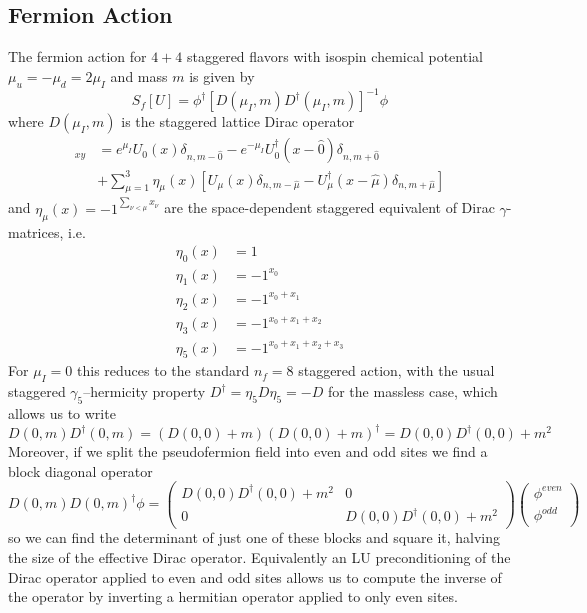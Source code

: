 \documentclass[a4paper,12pt]{article}
\begin{document}
\subsection{Fermion Action}
The fermion action for $4+4$ staggered flavors with isospin chemical potential $\mu_u = -\mu_d = 2 \mu_I$ and mass $m$ is given by
\begin{equation}
\label{eq:action_fermion}
 S_f[U] = \phi^{\dagger} [D(\mu_I,m) D^{\dagger}(\mu_I,m)]^{-1} \phi
\end{equation}
where $D(\mu_I,m)$ is the staggered lattice Dirac operator
\begin{align}
 [D(\mu_I,m)]_{xy} &= e^{\mu_I} U_{0}(x) \delta_{n,m-\hat0} - e^{-\mu_I} U_{0}^{\dagger}(x-\hat0) \delta_{n,m+\hat0} \\
 &+ \sum_{\mu=1}^{3} \eta_{\mu}(x) \left[ U_{\mu}(x) \delta_{n,m-\hat\mu} - U_{\mu}^{\dagger}(x-\hat\mu) \delta_{n,m+\hat\mu} \right]
\end{align}
and $\eta_{\mu}(x) = -1^{\sum_{\nu<\mu}x_{\nu}}$ are the space-dependent staggered equivalent of Dirac $\gamma$-matrices, i.e.
\begin{align}
 \eta_{0}(x) &= 1 \\
 \eta_{1}(x) &= -1^{x_0} \\
 \eta_{2}(x) &= -1^{x_0+x_1} \\
 \eta_{3}(x) &= -1^{x_0+x_1+x_2} \\
 \eta_{5}(x) &= -1^{x_0+x_1+x_2+x_3}
\end{align}
For $\mu_I=0$ this reduces to the standard $n_f=8$ staggered action, with the usual staggered $\gamma_5$--hermicity property $D^{\dagger} = \eta_5 D \eta_5 = -D$ for the massless case, 
which allows us to write 
\begin{equation}
D(0,m) D^{\dagger}(0,m) = (D(0,0) + m)(D(0,0) + m)^{\dagger} = D(0,0)D^{\dagger}(0,0) + m^2
\end{equation}
Moreover, if we split the pseudofermion field into even and odd sites we find a block diagonal operator
\begin{equation}
D(0,m) D(0,m)^{\dagger} \phi = 
\begin{pmatrix}
D(0,0)D^{\dagger}(0,0) + m^2 & 0 \\
0 & D(0,0)D^{\dagger}(0,0) + m^2
\end{pmatrix}
\begin{pmatrix}
\phi^{even} \\
\phi^{odd}
\end{pmatrix}
\end{equation}
so we can find the determinant of just one of these blocks and square it, halving the size of the effective Dirac operator. Equivalently an LU preconditioning of the Dirac operator 
applied to even and odd sites allows us to compute the inverse of the operator by inverting a hermitian operator applied to only even sites.
\end{document}
